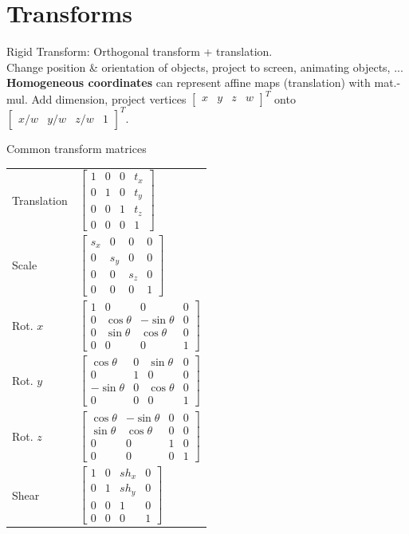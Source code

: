 \documentclass[a4paper,9pt]{article}
\begin{document}
\section{Transforms}
Rigid Transform: Orthogonal transform + translation.\\
Change position \& orientation of objects, project to screen, animating objects, ... \textbf{Homogeneous coordinates} can represent affine maps (translation) with mat.-mul. Add dimension, project vertices $\begin{bmatrix} x & y & z & w \end{bmatrix}^T$ onto $\begin{bmatrix} x / w & y / w & z / w & 1 \end{bmatrix}^T$.

\begin{subbox}{Common transform matrices}
\begin{tabular}{@{} l l @{} }
Translation & $\begin{bmatrix} 1 & 0 & 0 & t_x \\ 0 & 1 & 0 & t_y \\ 0 & 0 & 1 & t_z \\ 0 & 0 & 0 & 1 \end{bmatrix}$ \\
Scale & $\begin{bmatrix} s_x & 0 & 0 & 0 \\ 0 & s_y & 0 & 0 \\ 0 & 0 & s_z & 0 \\ 0 & 0 & 0 & 1 \end{bmatrix}$ \\
Rot. $x$ & $\begin{bmatrix} 1 & 0 & 0 & 0 \\ 0 & \cos\theta & -\sin\theta & 0 \\ 0 & \sin\theta & \cos\theta & 0 \\ 0 & 0 & 0 & 1 \end{bmatrix}$ \\
Rot. $y$ & $\begin{bmatrix} \cos\theta & 0 & \sin\theta & 0 \\ 0 & 1 & 0 & 0 \\ -\sin\theta & 0 & \cos\theta & 0 \\ 0 & 0 & 0 & 1 \end{bmatrix}$ \\
Rot. $z$ & $\begin{bmatrix} \cos\theta & -\sin\theta & 0 & 0 \\ \sin\theta & \cos\theta & 0 & 0 \\ 0 & 0 & 1 & 0 \\ 0 & 0 & 0 & 1 \end{bmatrix}$ \\
Shear & $\begin{bmatrix} 1 & 0 & sh_x & 0 \\ 0 & 1 & sh_y & 0 \\ 0 & 0 & 1 & 0 \\ 0 & 0 & 0 & 1 \end{bmatrix}$
\end{tabular}
\end{subbox}
\end{document}
